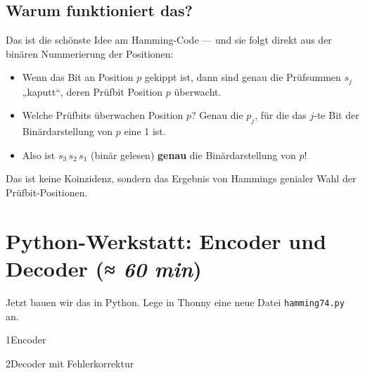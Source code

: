 \subsection*{Warum funktioniert das?}

Das ist die schönste Idee am Hamming-Code — und sie folgt direkt aus
der binären Nummerierung der Positionen:

\begin{itemize}
\item Wenn das Bit an Position $p$ gekippt ist, dann sind genau die
  Prüfsummen $s_j$ „kaputt“, deren Prüfbit Position $p$ überwacht.
\item Welche Prüfbits überwachen Position $p$? Genau die $p_j$, für die
  das $j$-te Bit der Binärdarstellung von $p$ eine 1 ist.
\item Also ist $s_3\, s_2\, s_1$ (binär gelesen) \textbf{genau} die
  Binärdarstellung von $p$!
\end{itemize}

Das ist keine Koinzidenz, sondern das Ergebnis von Hammings genialer
Wahl der Prüfbit-Positionen.

\section{Python-Werkstatt: Encoder und Decoder \normalfont(\textit{≈ 60 min})}

Jetzt bauen wir das in Python. Lege in Thonny eine neue Datei
\texttt{hamming74.py} an.

\begin{pythoneinheit}{1}{Encoder}
\end{pythoneinheit}

\begin{pythoneinheit}{2}{Decoder mit Fehlerkorrektur}
\end{pythoneinheit}

